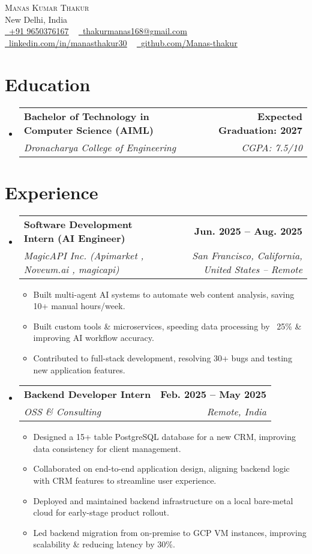\documentclass[letterpaper,11pt]{article}
\makeatletter
\newcommand{\resumeItem}[1]{
  \item\small{
    {#1 \vspace{-2pt}}
  }
}
\newcommand{\resumeSubheading}[4]{
  \vspace{-2pt}\item
  \begin{tabular*}{1.0\textwidth}[t]{l@{\extracolsep{\fill}}r}
    \textbf{#1} & \textbf{\small #2} \\
    \textit{\small#3} & \textit{\small #4} \\
  \end{tabular*}\vspace{-7pt}
}
\newcommand{\resumeSubHeadingListStart}{\begin{itemize}[leftmargin=0.0in, label={}]}
\newcommand{\resumeSubHeadingListEnd}{\end{itemize}}
\newcommand{\resumeItemListStart}{\begin{itemize}}
\newcommand{\resumeItemListEnd}{\end{itemize}\vspace{-5pt}}
\makeatother
\begin{document}
\begin{center}
    {\Huge \scshape Manas Kumar Thakur} \\ \vspace{3pt}
    New Delhi, India \\ \vspace{3pt}
    \small 
    \href{tel:+919650376167}{\raisebox{-0.1\height}\faPhone\ \underline{+91 9650376167}} ~
    \href{mailto:thakurmanas168@gmail.com}{\raisebox{-0.2\height}\faEnvelope\ \underline{thakurmanas168@gmail.com}} ~
    \href{https://www.linkedin.com/in/manasthakur30}{\raisebox{-0.2\height}\faLinkedin\ \underline{linkedin.com/in/manasthakur30}} ~
    \href{https://github.com/Manas-thakur}{\raisebox{-0.2\height}\faGithub\ \underline{github.com/Manas-thakur}}
    \vspace{-8pt}
\end{center}

\section{Education}
\resumeSubHeadingListStart
  \resumeSubheading
    {Bachelor of Technology in Computer Science (AIML)}{Expected Graduation: 2027}
    {Dronacharya College of Engineering}{CGPA: 7.5/10}
\resumeSubHeadingListEnd

\section{Experience}
\resumeSubHeadingListStart

  \resumeSubheading
    {Software Development Intern (AI Engineer)}{Jun. 2025 -- Aug. 2025}
    {MagicAPI Inc. (Apimarket , Noveum.ai , magicapi)}{San Francisco, California, United States -- Remote}
    \resumeItemListStart
      \resumeItem{Built multi-agent AI systems to automate web content analysis, saving 10+ manual hours/week.}
      \resumeItem{Built custom tools \& microservices, speeding data processing by ~25\% \& improving AI workflow accuracy.}
      \resumeItem{Contributed to full-stack development, resolving 30+ bugs and testing new application features.}
    \resumeItemListEnd

  \resumeSubheading
    {Backend Developer Intern}{Feb. 2025 -- May 2025}
    {OSS \& Consulting}{Remote, India}
    \resumeItemListStart
      \resumeItem{Designed a 15+ table PostgreSQL database for a new CRM, improving data consistency for client management.}
      \resumeItem{Collaborated on end-to-end application design, aligning backend logic with CRM features to streamline user experience.}
      \resumeItem{Deployed and maintained backend infrastructure on a local bare-metal cloud for early-stage product rollout.}
      \resumeItem{Led backend migration from on-premise to GCP VM instances, improving scalability \& reducing latency by 30\%.}
    \resumeItemListEnd
\resumeSubHeadingListEnd
\end{document}
